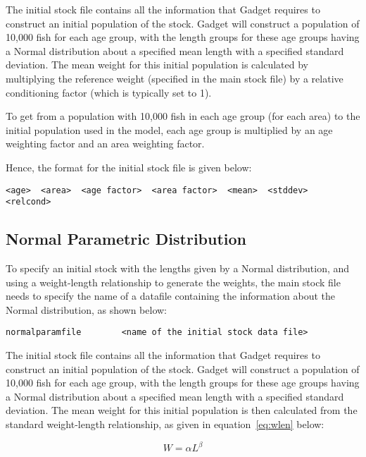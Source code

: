 \documentclass[10pt,twoside]{book}
\begin{document}
The initial stock file contains all the information that Gadget requires to construct an initial population of the stock.  Gadget will construct a population of 10,000 fish for each age group, with the length groups for these age groups having a Normal distribution about a specified mean length with a specified standard deviation.  The mean weight for this initial population is calculated by multiplying the reference weight (specified in the main stock file) by a relative conditioning factor (which is typically set to 1).

\bigskip
To get from a population with 10,000 fish in each age group (for each area) to the initial population used in the model, each age group is multiplied by an age weighting factor and an area weighting factor.

\bigskip
Hence, the format for the initial stock file is given below:

{\small\begin{verbatim}
<age>  <area>  <age factor>  <area factor>  <mean>  <stddev>  <relcond>
\end{verbatim}}

\subsection{Normal Parametric Distribution}
To specify an initial stock with the lengths given by a Normal distribution, and using a weight-length relationship to generate the weights, the main stock file needs to specify the name of a datafile containing the information about the Normal distribution, as shown below:

{\small\begin{verbatim}
normalparamfile        <name of the initial stock data file>
\end{verbatim}}

The initial stock file contains all the information that Gadget requires to construct an initial population of the stock.  Gadget will construct a population of 10,000 fish for each age group, with the length groups for these age groups having a Normal distribution about a specified mean length with a specified standard deviation.  The mean weight for this initial population is then calculated from the standard weight-length relationship, as given in equation~\ref{eq:wlen} below:

\begin{equation}\label{eq:wlen}
W = \alpha L^{\beta}
\end{equation}
\end{document}
